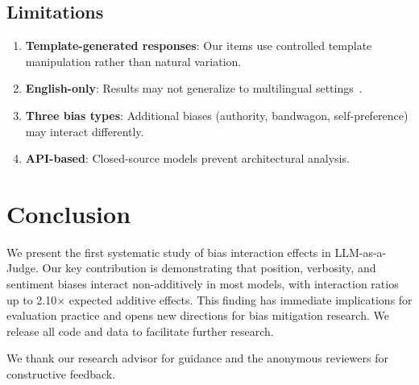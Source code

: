 \documentclass[11pt,twocolumn]{article}
\begin{document}
\subsection{Limitations}
\begin{enumerate}
    \item \textbf{Template-generated responses}: Our items use controlled template manipulation rather than natural variation.
    \item \textbf{English-only}: Results may not generalize to multilingual settings~\citep{dogruoz2026multilingual}.
    \item \textbf{Three bias types}: Additional biases (authority, bandwagon, self-preference) may interact differently.
    \item \textbf{API-based}: Closed-source models prevent architectural analysis.
\end{enumerate}

\section{Conclusion}
\label{sec:conclusion}

We present the first systematic study of bias interaction effects in LLM-as-a-Judge. Our key contribution is demonstrating that position, verbosity, and sentiment biases interact non-additively in most models, with interaction ratios up to 2.10$\times$ expected additive effects. This finding has immediate implications for evaluation practice and opens new directions for bias mitigation research. We release all code and data to facilitate further research.

\begin{acks}
We thank our research advisor for guidance and the anonymous reviewers for constructive feedback.
\end{acks}


{
\small
\setlength{\bibsep}{2pt}

}
\end{document}
